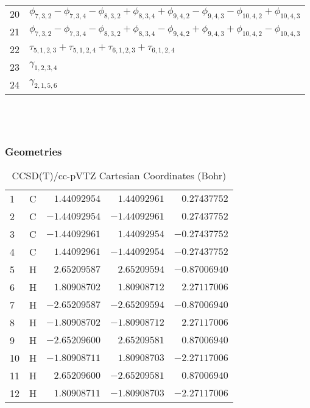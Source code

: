 \documentclass[10pt,oneside]{article}
\begin{document}
\begin{table}[h!]
\begin{tabular}{ll}
  20  & $\phi_{7,3,2} - \phi_{7,3,4} - \phi_{8,3,2} + \phi_{8,3,4} + \phi_{9,4,2} - \phi_{9,4,3} - \phi_{10,4,2} + \phi_{10,4,3}$ \\
  21  & $\phi_{7,3,2} - \phi_{7,3,4} - \phi_{8,3,2} + \phi_{8,3,4} - \phi_{9,4,2} + \phi_{9,4,3} + \phi_{10,4,2} - \phi_{10,4,3}$ \\
  22  & $\tau_{5,1,2,3} + \tau_{5,1,2,4} + \tau_{6,1,2,3} + \tau_{6,1,2,4}$ \\
  23  & $\gamma_{1,2,3,4}$ \\
  24  & $\gamma_{2,1,5,6}$ \\
\end{tabular}
\end{table}

\clearpage

\subsection{\ \ \ }

\subsubsection*{Geometries}
\begin{table}[h!]
\centering
\caption{CCSD(T)/cc-pVTZ Cartesian Coordinates (Bohr)}
\begin{tabular}{llrrr}
1  & C  & $ 1.44092954$ & $ 1.44092961$ & $ 0.27437752$ \\
2  & C  & $-1.44092954$ & $-1.44092961$ & $ 0.27437752$ \\
3  & C  & $-1.44092961$ & $ 1.44092954$ & $-0.27437752$ \\
4  & C  & $ 1.44092961$ & $-1.44092954$ & $-0.27437752$ \\
5  & H  & $ 2.65209587$ & $ 2.65209594$ & $-0.87006940$ \\
6  & H  & $ 1.80908702$ & $ 1.80908712$ & $ 2.27117006$ \\
7  & H  & $-2.65209587$ & $-2.65209594$ & $-0.87006940$ \\
8  & H  & $-1.80908702$ & $-1.80908712$ & $ 2.27117006$ \\
9  & H  & $-2.65209600$ & $ 2.65209581$ & $ 0.87006940$ \\
10 & H  & $-1.80908711$ & $ 1.80908703$ & $-2.27117006$ \\
11 & H  & $ 2.65209600$ & $-2.65209581$ & $ 0.87006940$ \\
12 & H  & $ 1.80908711$ & $-1.80908703$ & $-2.27117006$ \\
\end{tabular}
\end{table}
\end{document}
